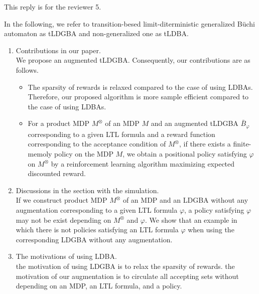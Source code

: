 \documentclass[10 pt, dvipdfmx]{article}
\theoremstyle{definition}
\begin{document}
This reply is for the reviewer 5.

In the following, we refer to transition-besed limit-diterministic generalized B\"{u}chi automaton as tLDGBA and non-generalized one as tLDBA.

\begin{enumerate}
  \item Contributions in our paper. \\
  We propose an augmented tLDGBA. Consequently, our contributions are as follows.
  
  \begin{itemize}
    \item  The sparsity of rewards is relaxed compared to the case of using LDBAs. Therefore, our proposed algorithm is more sample efficient compared to the case of using LDBAs.

    \item For a product MDP $M^{\otimes}$ of an MDP $M$ and an augmented tLDGBA $\bar{B}_{\varphi}$ corresponding to a given LTL formula and a reward function corresponding to the acceptance condition of $M^{\otimes}$, if there exists a finite-memoly policy on the MDP $M$, we obtain a positional policy satisfying $\varphi$ on $M^{\otimes}$ by a reinforcement learning algorithm maximizing expected discounted reward.

  \end{itemize}

  \item Discussions in the section with the simulation. \\
  If we construct product MDP $M^{\otimes}$ of an MDP and an LDGBA without any augmentation corresponding to a given LTL formula $\varphi$, a policy satisfying $\varphi$ may not be exist depending on $M^{\otimes}$ and $\varphi$. We show that an example in which there is not policies satisfying an LTL formula $\varphi$ when using the corresponding LDGBA without any augmentation.

  \item The motivations of using LDBA. \\
  the motivation of using LDGBA is to relax the sparsity of rewards. the motivation of our augmentation is to circulate all accepting sets without depending on an MDP, an LTL formula, and a policy.


\end{enumerate}
\end{document}
